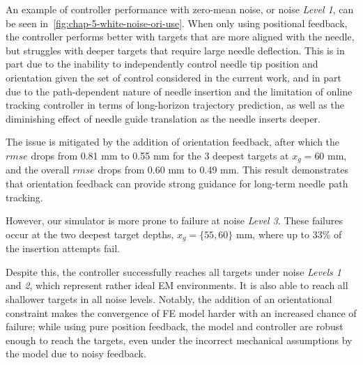 



An example of controller performance with zero-mean noise, or noise \textit{Level 1}, can be seen in~\cref{fig:chap-5-white-noise-ori-use}. When only using positional feedback, the controller performs better with targets that are more aligned with the needle, but struggles with deeper targets that require large needle deflection. This is in part due to the inability to independently control needle tip position and orientation given the set of control considered in the current work, and in part due to the path-dependent nature of needle insertion and the limitation of online tracking controller in terms of long-horizon trajectory prediction, as well as the diminishing effect of needle guide translation as the needle inserts deeper.

The issue is mitigated by the addition of orientation feedback, after which the $rmse$ drops from 0.81 mm to 0.55 mm for the 3 deepest targets at $x_g = 60$ mm, and the overall $rmse$ drops from 0.60 mm to 0.49 mm. This result demonstrates that orientation feedback can provide strong guidance for long-term needle path tracking.

However, our simulator is more prone to failure at noise \textit{Level 3}. These failures occur at the two deepest target depths, $x_g = \{55, 60\}$ mm, where up to 33\% of the insertion attempts fail.

Despite this, the controller successfully reaches all targets under noise \textit{Levels 1} and \textit{2}, which represent rather ideal EM environments. It is also able to reach all shallower targets in all noise levels. Notably, the addition of an orientational constraint makes the convergence of FE model harder with an increased chance of failure; while using pure position feedback, the model and controller are robust enough to reach the targets, even under the incorrect mechanical assumptions by the model due to noisy feedback.

